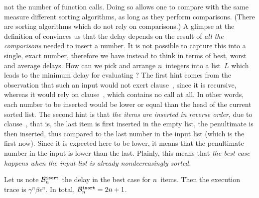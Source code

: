 not the number of function calls. Doing so allows one to compare with
the same measure different sorting algorithms, as long as they perform
comparisons. (There are sorting algorithms which do not rely on
comparisons.) A glimpse at the definition of 
convinces us that the delay depends on the result of \emph{all the
  comparisons} needed to insert a number. It is not possible to
capture this into a single, exact number, therefore we have instead to
think in terms of best, worst and average delays. How can we pick and
arrange \(n\)~integers into a list~\(L\) which leads to the minimum
delay for evaluating ? The first hint comes from
the observation that such an input would not exert
clause~\clause{\delta}, since it is recursive, whereas it would rely
on clause~\clause{\epsilon}, which contains no call at all. In other
words, each number to be inserted would be lower or equal than the
head of the current sorted list. The second hint is that \emph{the
  items are inserted in reverse order}, due to clause~\clause{\gamma},
that is, the last item is first inserted in the empty list, the
penultimate is then inserted, thus compared to the last number in the
input list (which is the first now). Since it is expected here to be
lower, it means that the penultimate number in the input is lower than
the last. Plainly, this means that \emph{the best case happens when
  the input list is already nondecreasingly sorted.}

Let us note \(\best{isort}{n}\) the delay in the best case for
\(n\)~items. Then the execution trace is
\(\gamma^n\beta\epsilon^n\). In total, \(\best{isort}{n} = 2n+1\).

